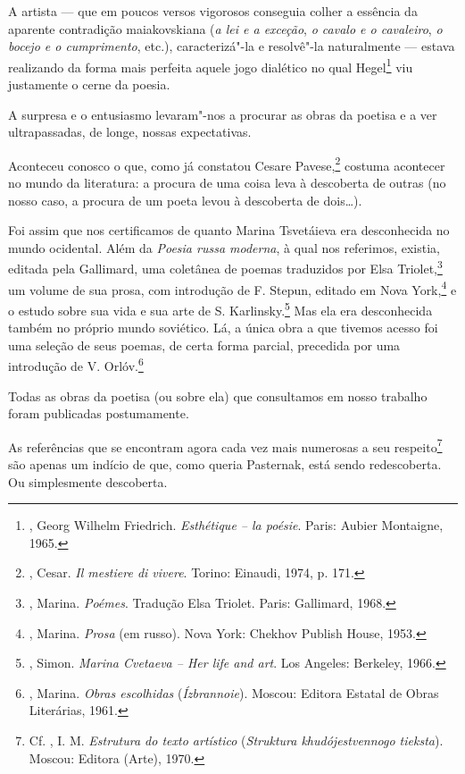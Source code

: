 A artista --- que em poucos versos vigorosos conseguia colher a
essência da aparente contradição maiakovskiana (\emph{a lei e a
exceção}, \emph{o cavalo e o cavaleiro}, \emph{o bocejo e o
cumprimento}, etc.), caracterizá"-la e resolvê"-la naturalmente
--- estava realizando da forma mais perfeita aquele jogo dialético
no qual Hegel\footnote{, Georg Wilhelm Friedrich.
\emph{Esthétique -- la poésie}. Paris: Aubier Montaigne, 1965.}
viu justamente o cerne da poesia.

A surpresa e o entusiasmo levaram"-nos a procurar as obras da
poetisa e a ver ultrapassadas, de longe, nossas expectativas.

Aconteceu conosco o que, como já constatou Cesare
Pavese,\footnote{, Cesar. \emph{Il mestiere di
vivere}. Torino: Einaudi, 1974, p. 171.} costuma acontecer no
mundo da literatura: a procura de uma coisa leva à descoberta
de outras (no nosso caso, a procura de um poeta levou à
descoberta de dois\ldots{}).

Foi assim que nos certificamos de quanto Marina Tsvetáieva era
desconhecida no mundo ocidental. Além da \emph{Poesia russa
moderna}, à qual nos referimos, existia, editada pela Gallimard,
uma coletânea de poemas traduzidos por Elsa Triolet,\footnote{,
Marina. \emph{Poémes}. Tradução Elsa Triolet. Paris: Gallimard,
1968.} um volume de sua prosa, com introdução de F. Stepun,
editado em Nova York,\footnote{, Marina.
\emph{Prosa} (em russo). Nova York: Chekhov Publish House,
1953.} e o estudo sobre sua vida e sua arte de S.
Karlinsky.\footnote{, Simon. \emph{Marina
Cvetaeva -- Her life and art}. Los Angeles: Berkeley, 1966.} Mas
ela era desconhecida também no próprio mundo soviético. Lá, a
única obra a que tivemos acesso foi uma seleção de seus poemas,
de certa forma parcial, precedida por uma introdução de
V. Orlóv.\footnote{, Marina. \emph{Obras
escolhidas} (\emph{Ízbrannoie}). Moscou: Editora Estatal de
Obras Literárias, 1961.}

Todas as obras da poetisa (ou sobre ela) que consultamos em nosso
trabalho foram publicadas postumamente.

As referências que se encontram agora cada vez mais numerosas a seu
respeito\footnote{Cf. , I. M. \emph{Estrutura do
texto artístico} (\emph{Struktura khudójestvennogo tieksta}). Moscou:
Editora (Arte), 1970.} são apenas um indício de que, como queria
Pasternak, está sendo redescoberta. Ou simplesmente descoberta.

